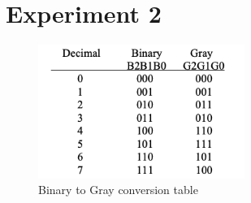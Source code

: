 \documentclass[12pt]{article}
\begin{document}
\section*{Experiment 2}
\begin{figure}[h]
    \centering
    \includegraphics[width=0.6\textwidth]{Binary to Gray.png}
    \caption{Binary to Gray conversion table}
\end{figure}
\end{document}
